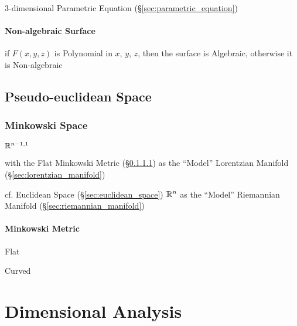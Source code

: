 3-dimensional Parametric Equation (\S\ref{sec:parametric_equation})



\paragraph{Non-algebraic Surface}\label{sec:nonalgebraic_surface}\hfill

if $F(x,y,z)$ is Polynomial in $x$, $y$, $z$, then the surface is
Algebraic, otherwise it is Non-algebraic



\subsection{Pseudo-euclidean Space}\label{sec:pseudo_euclidean}

\subsubsection{Minkowski Space}\label{sec:minkowski_euclidean}

$\mathbb{R}^{n-1,1}$

with the Flat Minkowski Metric (\S\ref{sec:minkowski_metric}) as the
``Model'' Lorentzian Manifold (\S\ref{sec:lorentzian_manifold})

cf. Euclidean Space (\S\ref{sec:euclidean_space}) $\mathbb{R}^n$ as the
``Model'' Riemannian Manifold (\S\ref{sec:riemannian_manifold})



\paragraph{Minkowski Metric}\label{sec:minkowski_metric}\hfill

Flat

Curved



\section{Dimensional Analysis}\label{sec:dimensional_analysis}

